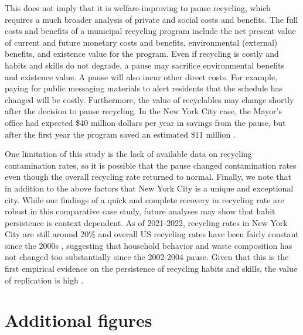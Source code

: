 \documentclass[12pt]{article}
\begin{document}
This does not imply that it is welfare-improving to pause recycling, which requires a much broader analysis of private and social costs and benefits. The full costs and benefits of a municipal recycling program include the net present value of current and future monetary costs and benefits, environmental (external) benefits, and existence value for the program.  Even if recycling is costly and habits and skills do not degrade, a pause may sacrifice environmental benefits and existence value.  A pause will also incur other direct costs.  For example, paying for public messaging materials to alert residents that the schedule has changed will be costly.  Furthermore, the value of recyclables may change shortly after the decision to pause recycling.  In the New York City case, the Mayor's office had expected \$40 million dollars per year in savings from the pause, but after the first year the program saved an estimated \$11 million \citep{nytsavings2003}.

One limitation of this study is the lack of available data on recycling contamination rates, so it is possible that the pause changed contamination rates even though the overall recycling rate returned to normal.  Finally, we note that in addition to the above factors that New York City is a unique and exceptional city.  While our findings of a quick and complete recovery in recycling rate are robust in this comparative case study, future analyses may show that habit persistence is context dependent.  As of 2021-2022, recycling rates in New York City are still around 20\% and overall US recycling rates have been fairly constant since the 2000s \citep{epa2022,catlinetal2021}, suggesting that household behavior and waste composition has not changed too substantially since the 2002-2004 pause.  Given that this is the first empirical evidence on the persistence of recycling habits and skills, the value of replication is high \citep{maniadistufanolist2017}. 




\clearpage

\appendix
\appendixpage

\section{Additional figures}
\end{document}
